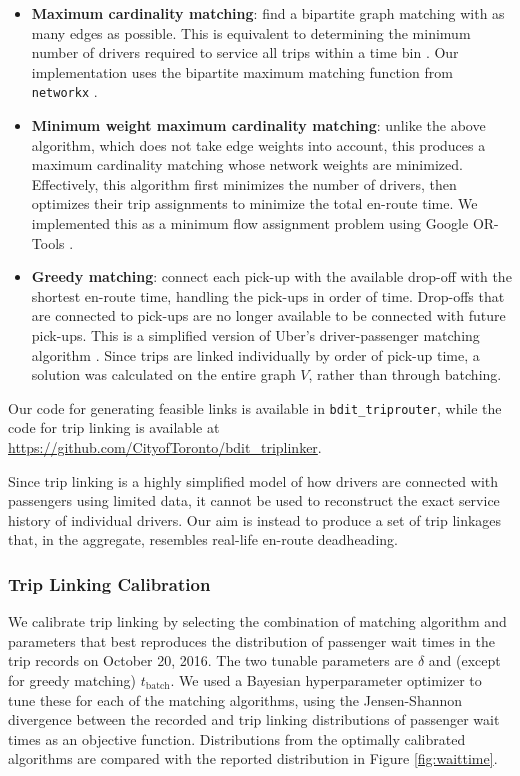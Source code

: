 \documentclass[]{trbunofficial_bdit_final}
\begin{document}
\begin{itemize}
\item
  \textbf{Maximum cardinality matching}: find a bipartite graph matching with as
  many edges as possible. This is equivalent to determining the minimum
  number of drivers required to service all trips within a time bin
  \cite{vazifeh2018addressing}. Our implementation uses the bipartite maximum
  matching function from \texttt{networkx} \cite{networkx}.
\item
  \textbf{Minimum weight maximum cardinality matching}: unlike the above
  algorithm, which does not take edge weights into account, this produces a
  maximum cardinality matching whose network weights are minimized.
  Effectively, this algorithm first minimizes the number of drivers, then
  optimizes their trip assignments to minimize the total en-route time.
  We implemented this as a minimum flow assignment problem using Google
  OR-Tools \cite{ortools}.
\item
  \textbf{Greedy matching}: connect each pick-up with the available drop-off with
  the shortest en-route time, handling the pick-ups in order of time.
  Drop-offs that are connected to pick-ups are no longer available to be
  connected with future pick-ups. This is a simplified version of Uber's
  driver-passenger matching algorithm \cite{hanna2016minimum, ubervideo}.
  Since trips are linked individually by order of pick-up time, a solution
  was calculated on the entire graph \(V\), rather than through batching.
\end{itemize}

\noindent Our code for generating feasible links is available in
\texttt{bdit\_triprouter}, while the code for trip linking is available at
\url{https://github.com/CityofToronto/bdit_triplinker}.

Since trip linking is a highly simplified model of how drivers are connected
with passengers using limited data, it cannot be used to reconstruct the exact
service history of individual drivers. Our aim is instead to produce a set of
trip linkages that, in the aggregate, resembles real-life en-route
deadheading.

\hypertarget{sec:triplinkingcalibration}{%
\subsubsection{Trip Linking Calibration}\label{sec:triplinkingcalibration}}

We calibrate trip linking by selecting the combination of matching algorithm
and parameters that best reproduces the distribution of passenger wait times in
the trip records on October 20, 2016. The two tunable parameters are \(\delta\)
and (except for greedy matching) \(t_\mathrm{batch}\). We used a Bayesian
hyperparameter optimizer to tune these for each of the matching algorithms,
using the Jensen-Shannon divergence \cite{lin1991divergence} between the
recorded and trip linking distributions of passenger wait times as an
objective function. Distributions from the optimally calibrated algorithms are
compared with the reported distribution in Figure \ref{fig:waittime}.
\end{document}
